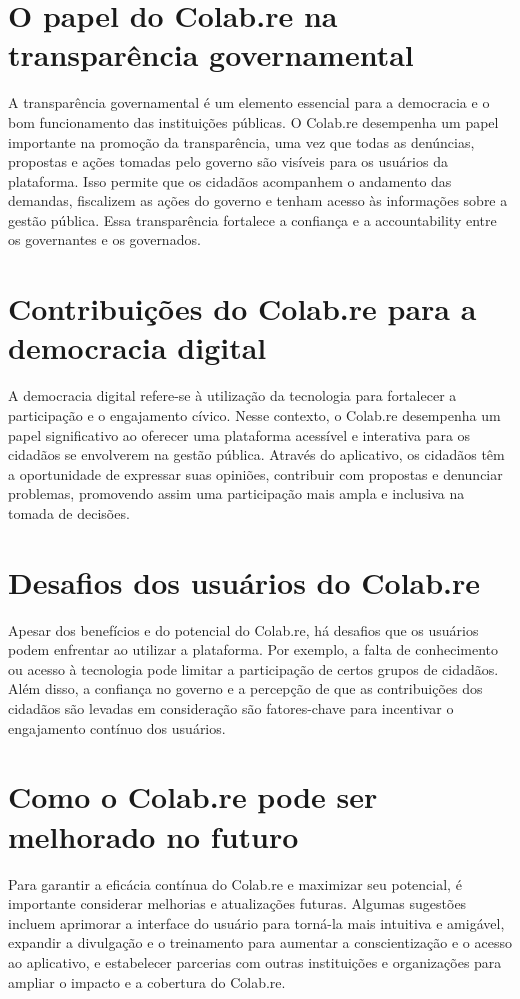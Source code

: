 \section*{O papel do Colab.re na transparência governamental}
A transparência governamental é um elemento essencial para a democracia e o bom funcionamento das instituições públicas. O Colab.re desempenha um papel importante na promoção da transparência, uma vez que todas as denúncias, propostas e ações tomadas pelo governo são visíveis para os usuários da plataforma. Isso permite que os cidadãos acompanhem o andamento das demandas, fiscalizem as ações do governo e tenham acesso às informações sobre a gestão pública. Essa transparência fortalece a confiança e a accountability entre os governantes e os governados.

\section*{Contribuições do Colab.re para a democracia digital}
A democracia digital refere-se à utilização da tecnologia para fortalecer a participação e o engajamento cívico. Nesse contexto, o Colab.re desempenha um papel significativo ao oferecer uma plataforma acessível e interativa para os cidadãos se envolverem na gestão pública. Através do aplicativo, os cidadãos têm a oportunidade de expressar suas opiniões, contribuir com propostas e denunciar problemas, promovendo assim uma participação mais ampla e inclusiva na tomada de decisões.

\section*{Desafios dos usuários do Colab.re}
Apesar dos benefícios e do potencial do Colab.re, há desafios que os usuários podem enfrentar ao utilizar a plataforma. Por exemplo, a falta de conhecimento ou acesso à tecnologia pode limitar a participação de certos grupos de cidadãos. Além disso, a confiança no governo e a percepção de que as contribuições dos cidadãos são levadas em consideração são fatores-chave para incentivar o engajamento contínuo dos usuários.

\section*{Como o Colab.re pode ser melhorado no futuro}
Para garantir a eficácia contínua do Colab.re e maximizar seu potencial, é importante considerar melhorias e atualizações futuras. Algumas sugestões incluem aprimorar a interface do usuário para torná-la mais intuitiva e amigável, expandir a divulgação e o treinamento para aumentar a conscientização e o acesso ao aplicativo, e estabelecer parcerias com outras instituições e organizações para ampliar o impacto e a cobertura do Colab.re.


